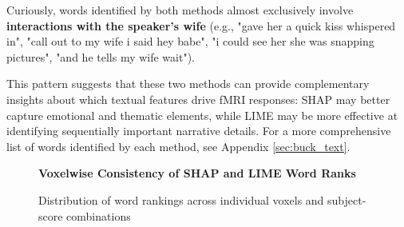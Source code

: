 \documentclass[10pt,letterpaper]{article}
\begin{document}
Curiously, words identified by both methods almost exclusively involve \textbf{interactions with the speaker's wife} (e.g., "gave her a quick kiss whispered in", "call out to my wife i said hey babe", "i could see her she was snapping pictures", "and he tells my wife wait").

This pattern suggests that these two methods can provide complementary insights about which textual features drive fMRI responses: SHAP may better capture emotional and thematic elements, while LIME may be more effective at identifying sequentially important narrative details. For a more comprehensive list of words identified by each method, see Appendix \ref{sec:buck_text}.

\begin{figure}[ht]
    \centering

    \parbox{\textwidth}{\centering 
        \fontsize{13pt}{13pt}\selectfont \textbf{Voxelwise Consistency of SHAP and LIME Word Ranks}  
        
        {\fontsize{11pt}{13pt}\selectfont Distribution of word rankings across individual voxels and subject-score combinations} 
    }
    

\end{figure}
\end{document}
